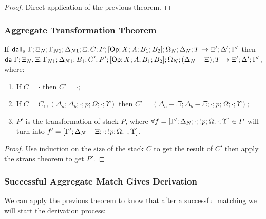 \begin{proof}
   Direct application of the previous theorem.
\end{proof}

\subsubsection{Aggregate Transformation Theorem}

\begin{theorem}
   If $\mathsf{dall}_a \; \Gamma; \Xi_N; \Gamma_{N1}; \Delta_{N1}; \Xi; C; P; [\mathsf{Op} ; X ; A ; B_1; B_2]; \Omega_N; \Delta_N; T \rightarrow \Xi'; \Delta'; \Gamma'$ then \\
      $\mathsf{da} \; \Gamma; \Xi_N, \Xi; \Gamma_{N1}; \Delta_{N1}; B_1; C' ; P'; [\mathsf{Op} ; X ; A ; B_1; B_2]; \Omega_N; (\Delta_N - \Xi); T \rightarrow \Xi'; \Delta'; \Gamma'$, where:
   
   \begin{enumerate}
      \item If $C = \cdot$ then $C' = \cdot$;
      \item If $C = C_1, (\Delta_a; \Delta_b; \cdot; p; \Omega; \cdot; \Upsilon)$ then $C' = (\Delta_a - \Xi; \Delta_b - \Xi; \cdot; p; \Omega; \cdot; \Upsilon)$;
      \item $P'$ is the transformation of stack $P$, where $\forall f = [\Gamma'; \Delta_N; \cdot; {!} p; \Omega; \cdot; \Upsilon] \in P$ will turn into $f' = [\Gamma'; \Delta_N - \Xi; \cdot; {!} p; \Omega; \cdot; \Upsilon]$.
   \end{enumerate}
\end{theorem}

\begin{proof}
   Use induction on the size of the stack $C$ to get the result of $C'$ then apply the strans theorem to get $P'$.
\end{proof}

\subsubsection{Successful Aggregate Match Gives Derivation}

We can apply the previous theorem to know that after a successful matching we will start the derivation process:


